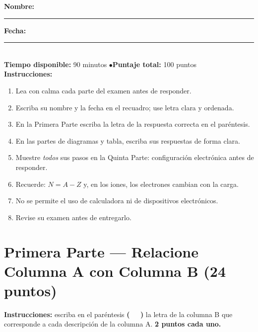 \documentclass[12pt, letterpaper]{article}
\begin{document}


\vspace{4pt}
\begin{cuadroinfo}
  \small
  \textbf{Nombre:} \rule{0.55\linewidth}{0.4pt} \quad \textbf{Fecha:} \rule{0.15\linewidth}{0.4pt} \\[6pt]
  \textbf{Tiempo disponible:} 90 minutos \quad$\bullet$\quad \textbf{Puntaje total:} 100 puntos \\[4pt]
  \textbf{Instrucciones:}
  \begin{enumerate}[leftmargin=*]
    \item Lea con calma cada parte del examen antes de responder.
    \item Escriba su nombre y la fecha en el recuadro; use letra clara y ordenada.
    \item En la Primera Parte escriba la letra de la respuesta correcta en el paréntesis.
    \item En las partes de diagramas y tabla, escriba sus respuestas de forma clara.
    \item Muestre \emph{todos} sus pasos en la Quinta Parte: configuración electrónica antes de responder.
    \item Recuerde: $N = A - Z$ y, en los iones, los electrones cambian con la carga.
    \item No se permite el uso de calculadora ni de dispositivos electrónicos.
    \item Revise su examen antes de entregarlo.
  \end{enumerate}
\end{cuadroinfo}

\newpage

\section*{Primera Parte — Relacione Columna A con Columna B (24 puntos)}

\noindent\textbf{Instrucciones:} escriba en el paréntesis \textbf{( \ \ )} la letra de la columna B que corresponde a cada descripción de la columna A. \textbf{2 puntos cada uno.}
\end{document}
